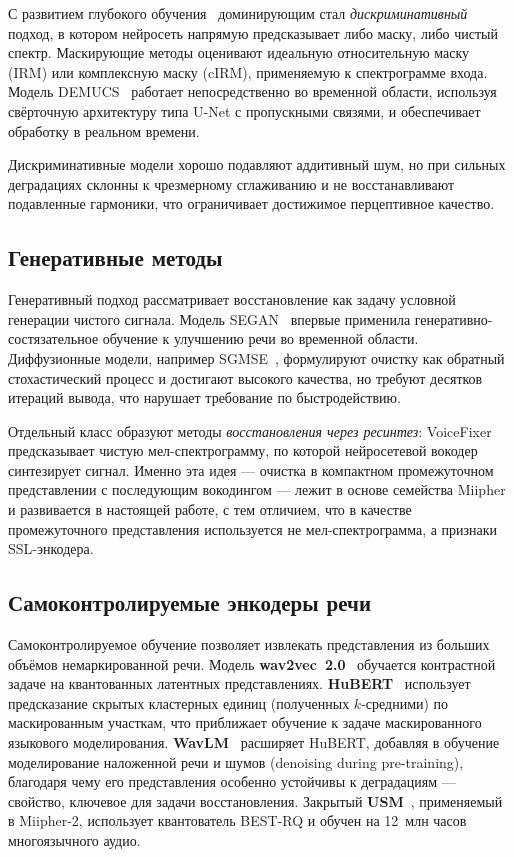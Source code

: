 С развитием глубокого обучения~\cite{goodfellow_ru} доминирующим стал
\emph{дискриминативный} подход, в котором нейросеть напрямую предсказывает либо
маску, либо чистый спектр. Маскирующие методы оценивают идеальную относительную
маску (IRM) или комплексную маску (cIRM), применяемую к спектрограмме входа.
Модель DEMUCS~\cite{demucs} работает непосредственно во временной области,
используя свёрточную архитектуру типа U-Net с пропускными связями, и обеспечивает
обработку в реальном времени.

Дискриминативные модели хорошо подавляют аддитивный шум, но при сильных
деградациях склонны к чрезмерному сглаживанию и не восстанавливают подавленные
гармоники, что ограничивает достижимое перцептивное качество.

\subsection{Генеративные методы}

Генеративный подход рассматривает восстановление как задачу условной генерации
чистого сигнала. Модель SEGAN~\cite{segan} впервые применила
генеративно-состязательное обучение к улучшению речи во временной области.
Диффузионные модели, например SGMSE~\cite{sgmse}, формулируют очистку как
обратный стохастический процесс и достигают высокого качества, но требуют
десятков итераций вывода, что нарушает требование по быстродействию.

Отдельный класс образуют методы \emph{восстановления через ресинтез}:
VoiceFixer~\cite{voicefixer} предсказывает чистую мел-спектрограмму, по которой
нейросетевой вокодер синтезирует сигнал. Именно эта идея --- очистка в
компактном промежуточном представлении с последующим вокодингом --- лежит в
основе семейства Miipher и развивается в настоящей работе, с тем отличием, что в
качестве промежуточного представления используется не мел-спектрограмма, а
признаки SSL-энкодера.

\subsection{Самоконтролируемые энкодеры речи}

Самоконтролируемое обучение позволяет извлекать представления из больших объёмов
немаркированной речи. Модель \textbf{wav2vec~2.0}~\cite{wav2vec2} обучается
контрастной задаче на квантованных латентных представлениях.
\textbf{HuBERT}~\cite{hubert} использует предсказание скрытых кластерных
единиц (полученных $k$-средними) по маскированным участкам, что приближает
обучение к задаче маскированного языкового моделирования. \textbf{WavLM}~\cite{wavlm}
расширяет HuBERT, добавляя в обучение моделирование наложенной речи и шумов
(denoising during pre-training), благодаря чему его представления особенно
устойчивы к деградациям --- свойство, ключевое для задачи восстановления.
Закрытый \textbf{USM}~\cite{usm}, применяемый в Miipher-2, использует
квантователь BEST-RQ и обучен на 12~млн часов многоязычного аудио.

